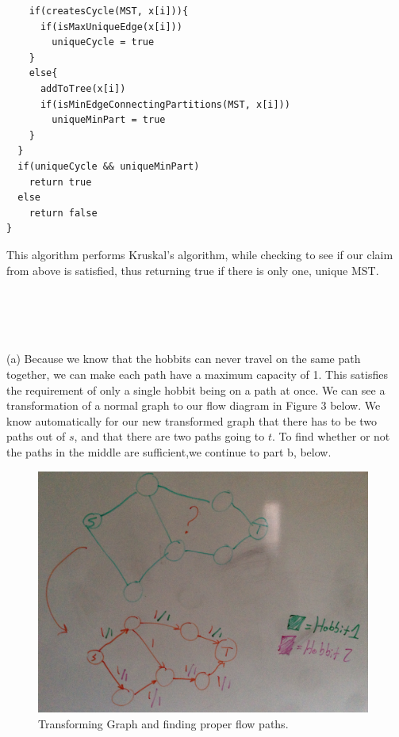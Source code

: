 \documentclass[11pt]{article} %
\begin{document}
{{{{\begin{verbatim}
    if(createsCycle(MST, x[i])){
      if(isMaxUniqueEdge(x[i]))
        uniqueCycle = true
    }
    else{
      addToTree(x[i])
      if(isMinEdgeConnectingPartitions(MST, x[i]))
        uniqueMinPart = true
    }
  }
  if(uniqueCycle && uniqueMinPart)
    return true
  else
    return false
}
\end{verbatim}
This algorithm performs Kruskal's algorithm, while checking to see if our claim from above is satisfied, thus returning true if there is only one, unique MST.
}
\\
\\
\\
\\
\indent(\large a) Because we know that the hobbits can never travel on the same path together, we can make each path have a maximum capacity of 1. This satisfies the requirement of only a single hobbit being on a path at once. We can see a transformation of a normal graph to our flow diagram in Figure 3 below. We know automatically for our new transformed graph that there has to be two paths out of $s$, and that there are two paths going to $t$. To find whether or not the paths in the middle are sufficient,we continue to part b, below. 
\\
\begin{figure}[ht!]
\centering
\includegraphics[width=110mm]{prob_4.JPG}
\caption{Transforming Graph and finding proper flow paths. }

\end{figure}}}}
\end{document}
